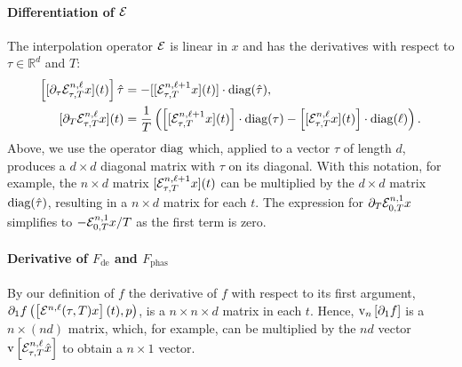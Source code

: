 \documentclass[11pt]{scrartcl}
\newcommand{\R}{\mathbb{R}}
\newcommand{\mlvar}[1]{\lstinline[keywordstyle=\color{var}]!#1!}
\newcommand{\blist}[1]{\mbox{\lstinline!#1!}}
\renewcommand{\vec}{\blist{v}}
\newcommand{\diag}{\mbox{\mlvar{diag}}}
\begin{document}
\paragraph{Differentiation of ${\cal E}$}
The
interpolation operator ${\cal E}$ is linear in $x$ and has the
derivatives with respect to $\tau\in\R^d$ and $T$:
\begin{align*}
  \left[[\partial_\tau{\cal E}^{n,\ell}_{\tau,T}x](t)\right]\hat\tau&=
  -[[{\cal E}^{n,\ell+1}_{\tau,T}x](t)]\cdot\diag(\hat{\tau})\mbox{,}\\
  [\partial_T{\cal E}^{n,\ell}_{\tau,T}x](t)&=
  \frac{1}{T}\left(
    \left[[{\cal E}^{n,\ell+1}_{\tau,T}x](t)\right]\cdot\diag(\tau)
    -\left[[{\cal E}^{n,\ell}_{\tau,T}x](t)\right]\cdot\diag(\ell)
  \right)\mbox{.}
\end{align*}
Above, we use the operator $\diag$ which, applied to a vector $\tau$
of length $d$, produces a $d\times d$ diagonal matrix with $\tau$ on
its diagonal. With this notation, for example, the $n\times d$ matrix
$[{\cal E}^{n,\ell+1}_{\tau,T}x](t)$ can be multiplied by the
$d\times d$ matrix $\diag(\hat\tau)$, resulting in a $n\times d$
matrix for each $t$. The expression for
$\partial_T{\cal E}^{n,1}_{0,T}x$ simplifies to $-{\cal E}^{n,1}_{0,T}x/T$ as the first term is zero.


\paragraph{Derivative of $F_\mathrm{de}$ and $F_\mathrm{phas}$} By our
definition of $f$ the derivative of $f$ with respect to its first
argument,
$\partial_1f\left(\left[{\cal
      E}^{n,\ell}(\tau,T)x\right](t),p\right)$, is a
$n\times n\times d$ matrix in each $t$. Hence, $\vec_n\left[\partial_1f\right]$ is
a $n\times (nd)$ matrix, which, for example, can be multiplied by the
$nd$ vector $\vec\left[{\cal E}^{n,\ell}_{\tau,T}\hat{x}\right]$ to obtain a $n\times 1$ vector.
\end{document}
